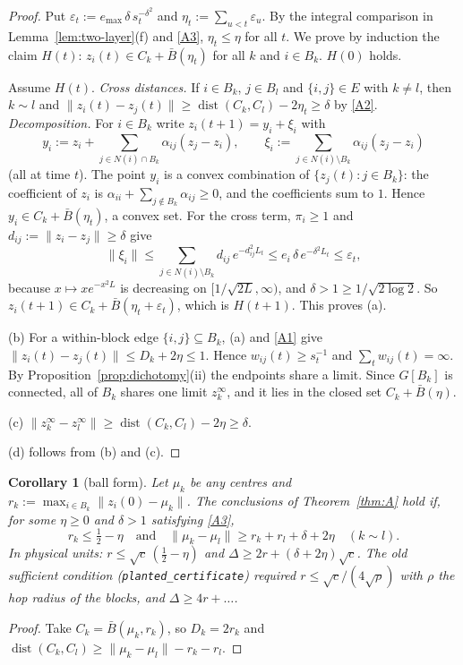 \documentclass[11pt]{article}
\newtheorem{corollary}[theorem]{Corollary}
\theoremstyle{definition}
\theoremstyle{remark}
\newcommand{\dist}{\operatorname{dist}}
\begin{document}
\begin{proof}
Put $\varepsilon_t:=e_{\max}\,\delta\,s_t^{-\delta^2}$ and $\eta_t:=\sum_{u<t}\varepsilon_u$. By the
integral comparison in Lemma~\ref{lem:two-layer}(f) and \eqref{A3}, $\eta_t\le\eta$ for all $t$. We prove by
induction the claim $H(t)$: $z_i(t)\in C_k+\bar B(\eta_t)$ for all $k$ and $i\in B_k$. $H(0)$ holds.

Assume $H(t)$. \emph{Cross distances.} If $i\in B_k$, $j\in B_l$ and $\{i,j\}\in E$ with $k\ne l$, then
$k\sim l$ and $\|z_i(t)-z_j(t)\|\ge\dist(C_k,C_l)-2\eta_t\ge\delta$ by \eqref{A2}.
\emph{Decomposition.} For $i\in B_k$ write $z_i(t+1)=y_i+\xi_i$ with
\[
y_i:=z_i+\sum_{j\in N(i)\cap B_k}\alpha_{ij}(z_j-z_i),\qquad
\xi_i:=\sum_{j\in N(i)\setminus B_k}\alpha_{ij}(z_j-z_i)
\]
(all at time $t$). The point $y_i$ is a convex combination of $\{z_j(t):j\in B_k\}$: the coefficient of $z_i$
is $\alpha_{ii}+\sum_{j\notin B_k}\alpha_{ij}\ge0$, and the coefficients sum to $1$. Hence
$y_i\in C_k+\bar B(\eta_t)$, a convex set. For the cross term, $\pi_i\ge1$ and $d_{ij}:=\|z_i-z_j\|\ge\delta$ give
\[
\|\xi_i\|\le\sum_{j\in N(i)\setminus B_k}d_{ij}\,e^{-d_{ij}^2L_t}\le e_i\,\delta\,e^{-\delta^2L_t}\le\varepsilon_t,
\]
because $x\mapsto xe^{-x^2L}$ is decreasing on $[1/\sqrt{2L},\infty)$, and $\delta>1\ge1/\sqrt{2\log2}$.
So $z_i(t+1)\in C_k+\bar B(\eta_t+\varepsilon_t)$, which is $H(t+1)$. This proves (a).

(b) For a within-block edge $\{i,j\}\subseteq B_k$, (a) and \eqref{A1} give
$\|z_i(t)-z_j(t)\|\le D_k+2\eta\le1$. Hence $w_{ij}(t)\ge s_t^{-1}$ and $\sum_tw_{ij}(t)=\infty$.
By Proposition~\ref{prop:dichotomy}(ii) the endpoints share a limit. Since $G[B_k]$ is connected, all of $B_k$
shares one limit $z_k^\infty$, and it lies in the closed set $C_k+\bar B(\eta)$.

(c) $\|z_k^\infty-z_l^\infty\|\ge\dist(C_k,C_l)-2\eta\ge\delta$.

(d) follows from (b) and (c).
\end{proof}

\begin{corollary}[ball form]\label{cor:ball}
Let $\mu_k$ be any centres and $r_k:=\max_{i\in B_k}\|z_i(0)-\mu_k\|$. The conclusions of
Theorem~\ref{thm:A} hold if, for some $\eta\ge0$ and $\delta>1$ satisfying \eqref{A3},
\[
r_k\le\tfrac12-\eta\quad\text{and}\quad\|\mu_k-\mu_l\|\ge r_k+r_l+\delta+2\eta\quad(k\sim l).
\]
In physical units: $r\le\sqrt c\,(\tfrac12-\eta)$ and $\Delta\ge 2r+(\delta+2\eta)\sqrt c$.
The old sufficient condition (\texttt{planted\_certificate}) required $r\le\sqrt c/(4\sqrt\rho)$
with $\rho$ the hop radius of the blocks, and $\Delta\ge4r+\dots$.
\end{corollary}
\begin{proof}
Take $C_k=\bar B(\mu_k,r_k)$, so $D_k=2r_k$ and $\dist(C_k,C_l)\ge\|\mu_k-\mu_l\|-r_k-r_l$.
\end{proof}
\end{document}
